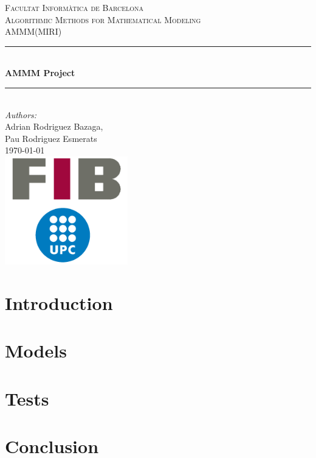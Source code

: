 \documentclass[a4paper]{article}
\begin{document}
\begin{titlepage}

\newcommand{\HRule}{\rule{\linewidth}{0.5mm}} 							%
\center 
 
\textsc{\LARGE Facultat Informàtica de Barcelona}\\[1cm]

\textsc{\Large Algorithmic Methods for Mathematical Modeling}\\[0.2cm]
\textsc{\large AMMM(MIRI)}\\[1cm] 										%
\HRule \\[0.8cm]
{ \huge \bfseries AMMM Project}\\[0.7cm]								%
\HRule \\[2cm]
\large
\emph{Authors: }\\
Adrian Rodriguez Bazaga,\\[0.25cm]
Pau Rodriguez Esmerats\\[1.5cm]													%
{\large \today}\\[2.5cm]
\includegraphics[width=0.4\textwidth]{./img/fib-upc-v2-transparent.png}\\[0.8cm] 	%
\vfill 
\end{titlepage}

\tableofcontents

\pagebreak

\section{Introduction}


\section{Models}






\section{Tests}






\section{Conclusion}

\end{document}
